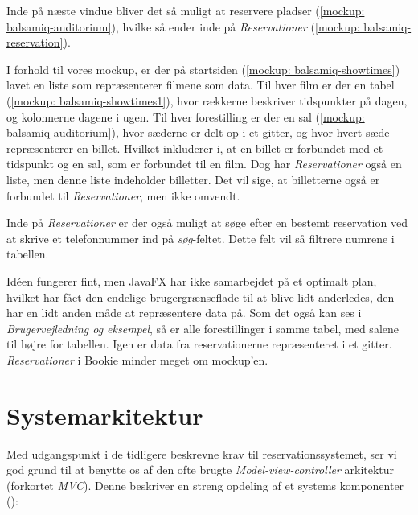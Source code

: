 Inde på næste vindue bliver det så muligt at reservere pladser (\ref{mockup: balsamiq-auditorium}), hvilke så ender inde på \textit{Reservationer} (\ref{mockup: balsamiq-reservation}).

I forhold til vores mockup, er der på startsiden (\ref{mockup: balsamiq-showtimes}) lavet en liste som repræsenterer filmene som data. Til hver film er der en tabel (\ref{mockup: balsamiq-showtimes1}), hvor rækkerne beskriver tidspunkter på dagen, og kolonnerne dagene i ugen. Til hver forestilling er der en sal (\ref{mockup: balsamiq-auditorium}), hvor sæderne er delt op i et gitter, og hvor hvert sæde repræsenterer en billet. Hvilket inkluderer i, at en billet er forbundet med et tidspunkt og en sal, som er forbundet til en film. Dog har \textit{Reservationer} også en liste, men denne liste indeholder billetter. Det vil sige, at billetterne også er forbundet til \textit{Reservationer}, men ikke omvendt.

Inde på \textit{Reservationer} er der også muligt at søge efter en bestemt reservation ved at skrive et telefonnummer ind på \textit{søg}-feltet. Dette felt vil så filtrere numrene i tabellen.

Idéen fungerer fint, men JavaFX har ikke samarbejdet på et optimalt plan, hvilket har fået den endelige brugergrænseflade til at blive lidt anderledes, den har en lidt anden måde at repræsentere data på. Som det også kan ses i \textit{Brugervejledning og eksempel}, så er alle forestillinger i samme tabel, med salene til højre for tabellen. Igen er data fra reservationerne repræsenteret i et gitter. \textit{Reservationer} i Bookie minder meget om mockup'en.

\section{Systemarkitektur}
\label{chapter:systemarkitektur}

Med udgangspunkt i de tidligere beskrevne krav til reservationssystemet, ser vi god grund til at benytte os af den ofte brugte \textit{Model-view-controller} arkitektur (forkortet \textit{MVC}). Denne beskriver en streng opdeling af et systems komponenter (\cite{wiki:mvc}):

